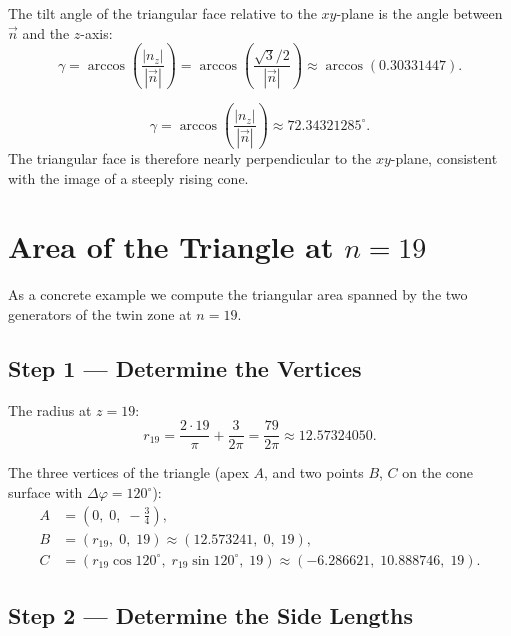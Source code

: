 The tilt angle of the triangular face relative to the $xy$-plane is the angle
between $\vec{n}$ and the $z$-axis:
\[
  \gamma
  = \arccos\!\left(\frac{|n_z|}{|\vec{n}|}\right)
  = \arccos\!\left(\frac{\sqrt{3}/2}{|\vec{n}|}\right)
  \approx \arccos(0.30331447).
\]

\begin{satz}
\begin{equation}
  \gamma = \arccos\!\left(\frac{|{n}_z|}{|\vec{n}|}\right)
  \approx 72.34321285^\circ.
\end{equation}
The triangular face is therefore nearly perpendicular to the $xy$-plane,
consistent with the image of a steeply rising cone.
\end{satz}

\section{Area of the Triangle at \texorpdfstring{$n = 19$}{n=19}}

As a concrete example we compute the triangular area spanned by the
two generators of the twin zone at $n = 19$.

\subsection*{Step 1 --- Determine the Vertices}

The radius at $z = 19$:
\[
  r_{19}
  = \frac{2\cdot 19}{\pi} + \frac{3}{2\pi}
  = \frac{79}{2\pi}
  \approx 12.57324050.
\]

The three vertices of the triangle (apex $A$, and two points $B$, $C$
on the cone surface with $\Delta\varphi = 120^\circ$):
\begin{align*}
  A &= \left(0,\; 0,\; -\tfrac{3}{4}\right), \\
  B &= \left(r_{19},\; 0,\; 19\right)
     \approx (12.573241,\; 0,\; 19), \\
  C &= \left(r_{19}\cos 120^\circ,\; r_{19}\sin 120^\circ,\; 19\right)
     \approx (-6.286621,\; 10.888746,\; 19).
\end{align*}

\subsection*{Step 2 --- Determine the Side Lengths}

